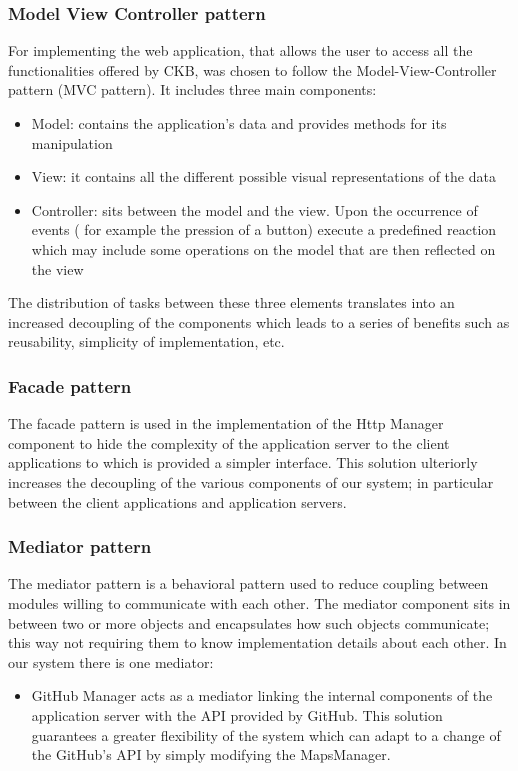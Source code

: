 \documentclass{article}
\begin{document}
\subsubsection{Model View Controller pattern}
For implementing the web application, that allows the user to access all the functionalities offered by CKB, was chosen to follow the Model-View-Controller pattern (MVC pattern). It includes three main components:
\begin{itemize}
\item Model: contains the application's data and provides methods for its manipulation
\item View: it contains all the different possible visual representations of the data
\item Controller: sits between the model and the view. Upon the occurrence of events ( for
example the pression of a button) execute a predefined reaction which may include
some operations on the model that are then reflected on the view
\end{itemize}

The distribution of tasks between these three elements translates into an increased decoupling of the components which leads to a series of benefits such as reusability, simplicity of implementation, etc.
\subsubsection{Facade pattern}
The facade pattern is used in the implementation of the Http Manager component to hide the complexity of the application server to the client applications to which is provided a simpler interface. This solution ulteriorly increases the decoupling of the various components of our system; in particular between the client applications and application servers.
\subsubsection{Mediator pattern}
The mediator pattern is a behavioral pattern used to reduce coupling between modules willing to communicate with each other. The mediator component sits in between two or more objects and encapsulates how such objects communicate; this way not requiring them to know implementation details about each other. In our system there is one mediator:
\begin{itemize}
\item GitHub Manager acts as a mediator linking the internal components of the application server with the API provided by GitHub. This solution guarantees a greater flexibility of the system which can adapt to a change of the GitHub’s API by simply modifying the MapsManager.
\end{itemize}
\end{document}
